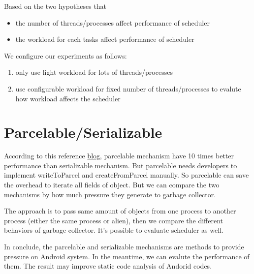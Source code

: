 \documentclass[11pt]{article}
\begin{document}
Based on the two hypotheses that
\begin{itemize}
\item the number of threads/processes affect performance of scheduler
\item the workload for each tasks affect performance of scheduler
\end{itemize}

We configure our experiments as follows:
\begin{enumerate}
\item only use light workload for lots of threads/processes
\item use configurable workload for fixed number of threads/processes to evalute how workload affects the scheduler
\end{enumerate}

\section{\label{Parcelable/Serializable}Parcelable/Serializable}
\label{sec-7}
According to this reference \href{http://www.developerphil.com/parcelable-vs-serializable/}{blog}, parcelable mechanism have 10 times better performance than serializable mechanism.
But parcelable needs developers to implement writeToParcel and createFromParcel manually.
So parcelable can save the overhead to iterate all fields of object.
But we can compare the two mechanisms by how much pressure they generate to garbage collector.

The approach is to pass same amount of objects from one process to another process (either the same process or alien),
then we compare the different behaviors of garbage collector.
It's possible to evaluate scheduler as well.

In conclude, the parcelable and serializable mechanisms are methods to provide pressure on Android system.
In the meantime, we can evalute the performance of them.
The result may improve static code analysis of Andorid codes.
\end{document}
